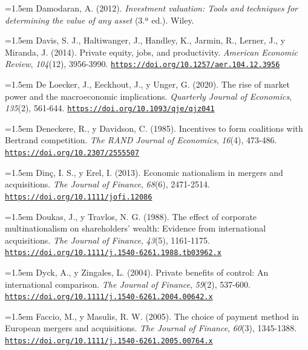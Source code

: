 \documentclass[10pt,a4paper]{article}
\begin{document}
\noindent\hangindent=1.5em Damodaran, A. (2012). \textit{Investment valuation: Tools and techniques for determining the value of any asset} (3.ª ed.). Wiley.

\noindent\hangindent=1.5em Davis, S. J., Haltiwanger, J., Handley, K., Jarmin, R., Lerner, J., y Miranda, J. (2014). Private equity, jobs, and productivity. \textit{American Economic Review}, \textit{104}(12), 3956-3990. \href{https://doi.org/10.1257/aer.104.12.3956}{\nolinkurl{https://doi.org/10.1257/aer.104.12.3956}}

\noindent\hangindent=1.5em De Loecker, J., Eeckhout, J., y Unger, G. (2020). The rise of market power and the macroeconomic implications. \textit{Quarterly Journal of Economics}, \textit{135}(2), 561-644. \href{https://doi.org/10.1093/qje/qjz041}{\nolinkurl{https://doi.org/10.1093/qje/qjz041}}

\noindent\hangindent=1.5em Deneckere, R., y Davidson, C. (1985). Incentives to form coalitions with Bertrand competition. \textit{The RAND Journal of Economics}, \textit{16}(4), 473-486. \href{https://doi.org/10.2307/2555507}{\nolinkurl{https://doi.org/10.2307/2555507}}

\noindent\hangindent=1.5em Dinç, I. S., y Erel, I. (2013). Economic nationalism in mergers and acquisitions. \textit{The Journal of Finance}, \textit{68}(6), 2471-2514. \href{https://doi.org/10.1111/jofi.12086}{\nolinkurl{https://doi.org/10.1111/jofi.12086}}

\noindent\hangindent=1.5em Doukas, J., y Travlos, N. G. (1988). The effect of corporate multinationalism on shareholders' wealth: Evidence from international acquisitions. \textit{The Journal of Finance}, \textit{43}(5), 1161-1175. \href{https://doi.org/10.1111/j.1540-6261.1988.tb03962.x}{\nolinkurl{https://doi.org/10.1111/j.1540-6261.1988.tb03962.x}}

\noindent\hangindent=1.5em Dyck, A., y Zingales, L. (2004). Private benefits of control: An international comparison. \textit{The Journal of Finance}, \textit{59}(2), 537-600. \href{https://doi.org/10.1111/j.1540-6261.2004.00642.x}{\nolinkurl{https://doi.org/10.1111/j.1540-6261.2004.00642.x}}

\noindent\hangindent=1.5em Faccio, M., y Masulis, R. W. (2005). The choice of payment method in European mergers and acquisitions. \textit{The Journal of Finance}, \textit{60}(3), 1345-1388. \href{https://doi.org/10.1111/j.1540-6261.2005.00764.x}{\nolinkurl{https://doi.org/10.1111/j.1540-6261.2005.00764.x}}
\end{document}
